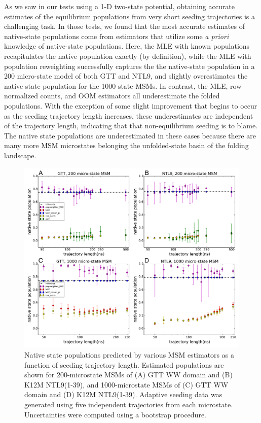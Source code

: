 \documentclass[%
 aip,
rsi,%
 amsmath,amssymb,
 reprint,%
]{revtex4-1}
\begin{document}
As we saw in our tests using a 1-D two-state potential, obtaining accurate estimates of the equilibrium populations from very short seeding trajectories is a challenging task.  In those tests, we found that the most accurate estimates of native-state populations come from estimators that utilize some \textit{a priori} knowledge of native-state populations. Here, the MLE with known populations recapitulates the native population exactly (by definition), while the MLE with population reweighting successfully captures the the native-state population in a 200 micro-state model of both GTT and NTL9, and slightly overestimates the native state population for the 1000-state MSMs. In contrast, the MLE, row-normalized counts, and OOM estimators all underestimate the folded populations.  With the exception of some slight improvement that begins to occur as the seeding trajectory length increases, these underestimates are independent of the trajectory length, indicating that that non-equilibrium seeding is to blame.  The native state populations are underestimated in these cases because there are many more MSM microstates belonging the unfolded-state basin of the folding landscape.


\begin{figure}[ht!]
\includegraphics[width=0.55\paperwidth]{figures/NTL9_GTT/native_state_population_only/native_population_5trajs_cluster200_1000_omi_new.pdf}%
\caption{Native state populations predicted by various MSM estimators as a function of seeding trajectory length. Estimated populations are shown for 200-microstate MSMs of (A) GTT WW domain and (B) K12M NTL9(1-39), and 1000-microstate MSMs of (C) GTT WW domain and (D) K12M NTL9(1-39). Adaptive seeding data was generated using five independent trajectories from each microstate. Uncertainties were computed using a bootstrap procedure.}
\label{fig:all-atom-nativepops-5seeds}
\end{figure}
\end{document}
